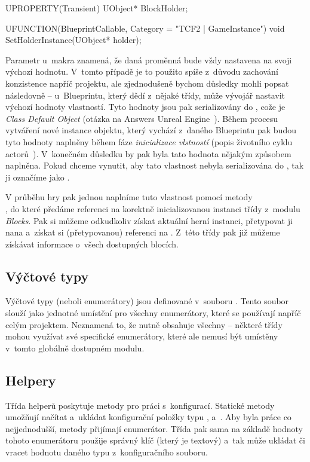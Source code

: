 \begin{code}
	UPROPERTY(Transient)
		UObject* BlockHolder;

	UFUNCTION(BlueprintCallable, Category = "TCF2 | GameInstance")
		void SetHolderInstance(UObject* holder);
\end{code}



 Parametr  u~makra  znamená, že daná proměnná bude vždy nastavena na svoji výchozí hodnotu. V~tomto případě je to použito spíše z~důvodu zachování konzistence napříč projektu, ale zjednodušeně bychom důsledky mohli popsat následovně -- u~Blueprintu, který dědí z~nějaké \CPP{} třídy, může vývojář nastavit výchozí hodnoty vlastností. Tyto hodnoty jsou pak serializovány do \CDO{}, cože je \textit{Class Default Object} (otázka na Answers Unreal Engine~\citep{ue_cdo}). Během procesu vytváření nové instance objektu, který vychází z~daného Blueprintu pak budou tyto hodnoty naplněny během fáze \textit{inicializace vlstností} (popis životního cyklu actorů~\citep{ue_actor_life}). V~konečném důsledku by pak byla tato hodnota nějakým způsobem naplněna. Pokud chceme vynutit, aby tato vlastnost nebyla serializována do \CDO{}, tak ji označíme jako .

V průběhu hry pak jednou naplníme tuto vlastnost pomocí metody\\ , do které předáme referenci na korektně inicializovanou instanci třídy  z~modulu \textit{Blocks}. Pak si můžeme odkudkoliv získat aktuální herní instanci, přetypovat ji nana  a~získat si (přetypovanou) referenci na . Z~této třídy pak již můžeme získávat informace o~všech dostupných blocích.

\subsection{Výčtové typy}

Výčtové typy (neboli enumerátory) jsou definované v~souboru . Tento soubor slouží jako jednotné umístění pro všechny enumerátory, které se používají napříč celým projektem. Neznamená to, že nutně obsahuje všechny -- některé třídy mohou využívat své specifické enumerátory, které ale nemusí být umístěny v~tomto globálně dostupném modulu.


\subsection{Helpery}

Třída helperů  poskytuje metody pro práci s~konfigurací. Statické metody umožňují načítat a~ukládat konfigurační položky typu ,  a~.
Aby byla práce co nejjednodušší, metody přijímají enumerátor\linebreak[4]. Třída pak sama na základě hodnoty tohoto enumerátoru použije správný klíč (který je textový) a~tak může ukládat či vracet hodnotu daného typu z~konfiguračního souboru.